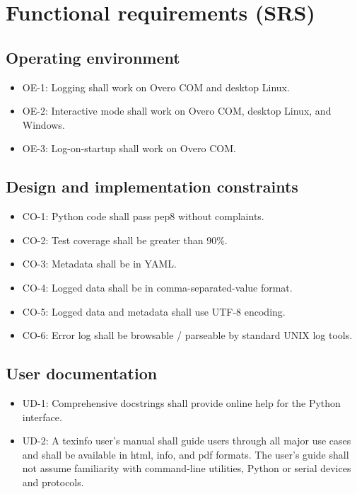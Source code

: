 \documentclass[pdftex,oneside,12pt,a4paper]{book}
\begin{document}
\chapter{Functional requirements (SRS)}
\section{Operating environment}
\begin{itemize}
\item OE-1: Logging shall work on Overo COM and desktop Linux.
\item OE-2: Interactive mode shall work on Overo COM, desktop Linux, and Windows.
\item OE-3: Log-on-startup shall work on Overo COM.
\end{itemize}

\section{Design and implementation constraints}
\begin{itemize}
\item CO-1: Python code shall pass pep8 without complaints.
\item CO-2: Test coverage shall be greater than 90\%.
\item CO-3: Metadata shall be in YAML.
\item CO-4: Logged data shall be in comma-separated-value format.
\item CO-5: Logged data and metadata shall use UTF-8 encoding.
\item CO-6: Error log shall be browsable / parseable by standard UNIX log tools.
\end{itemize}

\section{User documentation}
\begin{itemize}
\item UD-1: Comprehensive docstrings shall provide online help for the Python interface.
\item UD-2: A texinfo user's manual shall guide users through all major use cases and shall be available in html, info, and pdf formats.  The user's guide shall not assume familiarity with command-line utilities, Python or serial devices and protocols.
\end{itemize}
\end{document}
